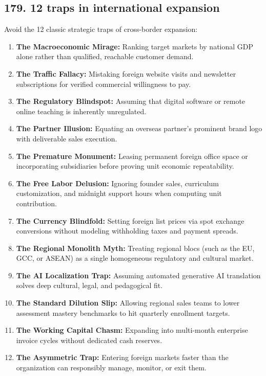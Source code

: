 \subsection{179. 12 traps in international expansion}

Avoid the 12 classic strategic traps of cross-border expansion:
\begin{enumerate}
    \item \textbf{The Macroeconomic Mirage:} Ranking target markets by national GDP alone rather than qualified, reachable customer demand.
    \item \textbf{The Traffic Fallacy:} Mistaking foreign website visits and newsletter subscriptions for verified commercial willingness to pay.
    \item \textbf{The Regulatory Blindspot:} Assuming that digital software or remote online teaching is inherently unregulated.
    \item \textbf{The Partner Illusion:} Equating an overseas partner's prominent brand logo with deliverable sales execution.
    \item \textbf{The Premature Monument:} Leasing permanent foreign office space or incorporating subsidiaries before proving unit economic repeatability.
    \item \textbf{The Free Labor Delusion:} Ignoring founder sales, curriculum customization, and midnight support hours when computing unit contribution.
    \item \textbf{The Currency Blindfold:} Setting foreign list prices via spot exchange conversions without modeling withholding taxes and payment spreads.
    \item \textbf{The Regional Monolith Myth:} Treating regional blocs (such as the EU, GCC, or ASEAN) as a single homogeneous regulatory and cultural market.
    \item \textbf{The AI Localization Trap:} Assuming automated generative AI translation solves deep cultural, legal, and pedagogical fit.
    \item \textbf{The Standard Dilution Slip:} Allowing regional sales teams to lower assessment mastery benchmarks to hit quarterly enrollment targets.
    \item \textbf{The Working Capital Chasm:} Expanding into multi-month enterprise invoice cycles without dedicated cash reserves.
    \item \textbf{The Asymmetric Trap:} Entering foreign markets faster than the organization can responsibly manage, monitor, or exit them.
\end{enumerate}

